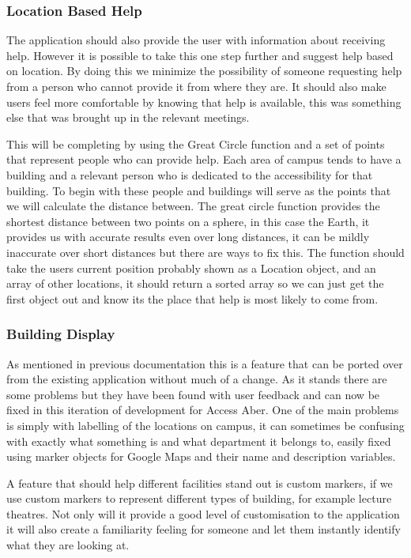 \subsubsection{Location Based Help}
The application should also provide the user with information about receiving help. However it is possible to take this one step further and suggest help based on location. By doing this we minimize the possibility of someone requesting help from a person who cannot provide it from where they are. It should also make users feel more comfortable by knowing that help is available, this was something else that was brought up in the relevant meetings. 

This will be completing by using the Great Circle function\cite{circle} and a set of points that represent people who can provide help. Each area of campus tends to have a building and a relevant person who is dedicated to the accessibility for that building. To begin with these people and buildings will serve as the points that we will calculate the distance between. The great circle function provides the shortest distance between two points on a sphere, in this case the Earth, it provides us with accurate results even over long distances, it can be mildly inaccurate over short distances but there are ways to fix this. The function should take the users current position probably shown as a Location object, and an array of other locations, it should return a sorted array so we can just get the first object out and know its the place that help is most likely to come from. 
\subsubsection{Building Display}
As mentioned in previous documentation this is a feature that can be ported over from the existing application without much of a change. As it stands there are some problems but they have been found with user feedback and can now be fixed in this iteration of development for Access Aber. One of the main problems is simply with labelling of the locations on campus, it can sometimes be confusing with exactly what something is and what department it belongs to, easily fixed using marker objects for Google Maps and their name and description variables. 

A feature that should help different facilities stand out is custom markers, if we use custom markers to represent different types of building, for example lecture theatres. Not only will it provide a good level of customisation to the application it will also create a familiarity feeling for someone and let them instantly identify what they are looking at. 

